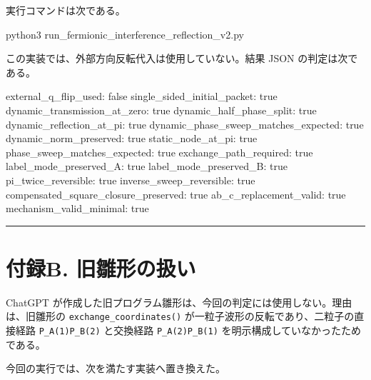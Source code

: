 \documentclass[
  a4paper,
]{article}
\newenvironment{Shaded}{}{}
\newcommand{\NormalTok}[1]{#1}
\begin{document}
実行コマンドは次である。

\begin{Shaded}
\begin{Highlighting}[]
\NormalTok{python3 run\_fermionic\_interference\_reflection\_v2.py}
\end{Highlighting}
\end{Shaded}

この実装では、外部方向反転代入は使用していない。結果 JSON
の判定は次である。

\begin{Shaded}
\begin{Highlighting}[]
\NormalTok{external\_q\_flip\_used: false}
\NormalTok{single\_sided\_initial\_packet: true}
\NormalTok{dynamic\_transmission\_at\_zero: true}
\NormalTok{dynamic\_half\_phase\_split: true}
\NormalTok{dynamic\_reflection\_at\_pi: true}
\NormalTok{dynamic\_phase\_sweep\_matches\_expected: true}
\NormalTok{dynamic\_norm\_preserved: true}
\NormalTok{static\_node\_at\_pi: true}
\NormalTok{phase\_sweep\_matches\_expected: true}
\NormalTok{exchange\_path\_required: true}
\NormalTok{label\_mode\_preserved\_A: true}
\NormalTok{label\_mode\_preserved\_B: true}
\NormalTok{pi\_twice\_reversible: true}
\NormalTok{inverse\_sweep\_reversible: true}
\NormalTok{compensated\_square\_closure\_preserved: true}
\NormalTok{ab\_c\_replacement\_valid: true}
\NormalTok{mechanism\_valid\_minimal: true}
\end{Highlighting}
\end{Shaded}

\begin{center}\rule{0.5\linewidth}{0.5pt}\end{center}

\section{付録B.
旧雛形の扱い}\label{ux4ed8ux9332b.-ux65e7ux96dbux5f62ux306eux6271ux3044}

ChatGPT
が作成した旧プログラム雛形は、今回の判定には使用しない。理由は、旧雛形の
\texttt{exchange\_coordinates()}
が一粒子波形の反転であり、二粒子の直接経路 \texttt{P\_A(1)P\_B(2)}
と交換経路 \texttt{P\_A(2)P\_B(1)} を明示構成していなかったためである。

今回の実行では、次を満たす実装へ置き換えた。
\end{document}
